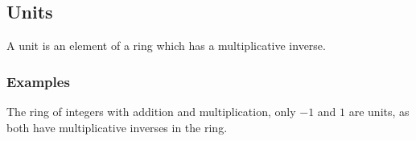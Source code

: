 
\subsection{Units}

A unit is an element of a ring which has a multiplicative inverse.
\subsubsection{Examples}

The ring of integers with addition and multiplication, only \(-1\) and \(1\) are units, as both have multiplicative inverses in the ring.


